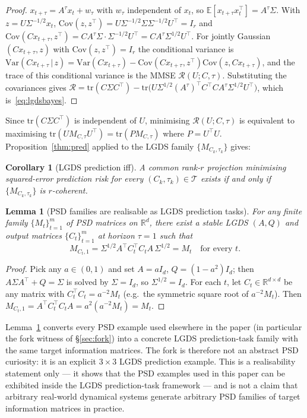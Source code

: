 \documentclass[final,3p,times]{elsarticle}
\newtheorem{corollary}[theorem]{Corollary}
\newtheorem{lemma}[theorem]{Lemma}
\newcommand{\tr}{\mathrm{tr}}
\newcommand{\R}{\mathbb{R}}
\newcommand{\E}{\mathbb{E}}
\begin{document}
\begin{proof}
$x_{t+\tau}=A^\tau x_t+w_\tau$ with $w_\tau$ independent of $x_t$, so
$\E[x_{t+\tau}x_t^\top]=A^\tau\Sigma$.
With $z=U\Sigma^{-1/2}x_t$, $\mathrm{Cov}(z,z^\top)
=U\Sigma^{-1/2}\Sigma\Sigma^{-1/2}U^\top=I_r$ and
$\mathrm{Cov}(Cx_{t+\tau},z^\top)
=CA^\tau\Sigma\cdot\Sigma^{-1/2}U^\top=CA^\tau\Sigma^{1/2}U^\top$.
For jointly Gaussian $(Cx_{t+\tau},z)$ with $\mathrm{Cov}(z,z^\top)=I_r$
the conditional variance is
$\mathrm{Var}(Cx_{t+\tau}\,|\,z)
=\mathrm{Var}(Cx_{t+\tau})-\mathrm{Cov}(Cx_{t+\tau},z^\top)\mathrm{Cov}(z,Cx_{t+\tau})$,
and the trace of this conditional variance is the MMSE
$\mathcal{R}(U;C,\tau)$.
Substituting the covariances gives
$\mathcal{R}=\tr(C\Sigma C^\top)-\tr\!\bigl(U\Sigma^{1/2}(A^\tau)^\top
C^\top C A^\tau\Sigma^{1/2}U^\top\bigr)$, which is~\eqref{eq:lgdsbayes}.
\end{proof}

Since $\tr(C\Sigma C^\top)$ is independent of $U$, minimising
$\mathcal{R}(U;C,\tau)$ is equivalent to maximising
$\tr(U M_{C,\tau} U^\top)=\tr(P M_{C,\tau})$ where $P=U^\top U$.
Proposition~\ref{thm:pred} applied to the LGDS family
$\{M_{C_k,\tau_k}\}$ gives:

\begin{corollary}[LGDS prediction iff]
A common rank-$r$ projection minimising squared-error prediction risk
for every $(C_k,\tau_k)\in\mathcal{T}$ exists if and only if
$\{M_{C_k,\tau_k}\}$ is $r$-coherent.
\end{corollary}

\begin{lemma}[PSD families are realisable as LGDS prediction tasks]
\label{lem:realisability}
For any finite family $\{M_t\}_{t=1}^m$ of PSD matrices on $\R^d$, there
exist a stable LGDS $(A,Q)$ and output matrices $\{C_t\}_{t=1}^m$ at
horizon $\tau=1$ such that
\[
M_{C_t,1}
=\Sigma^{1/2}A^\top C_t^\top C_t A\,\Sigma^{1/2}=M_t
\quad\text{for every }t.
\]
\end{lemma}

\begin{proof}
Pick any $a\in(0,1)$ and set $A=aI_d$, $Q=(1-a^2)I_d$; then
$A\Sigma A^\top+Q=\Sigma$ is solved by $\Sigma=I_d$, so
$\Sigma^{1/2}=I_d$.
For each $t$, let $C_t\in\R^{d\times d}$ be any matrix with
$C_t^\top C_t=a^{-2}M_t$ (e.g.\ the symmetric square root of
$a^{-2}M_t$).
Then $M_{C_t,1}=A^\top C_t^\top C_t A=a^2(a^{-2}M_t)=M_t$.
\end{proof}

\noindent
Lemma~\ref{lem:realisability} converts every PSD example used elsewhere
in the paper (in particular the fork witness of \S\ref{sec:fork}) into
a concrete LGDS prediction-task family with the same target information
matrices.
The fork is therefore not an abstract PSD curiosity: it is an explicit
$3\times 3$ LGDS prediction example.
This is a realisability statement only --- it shows that the
PSD examples used in this paper can be exhibited inside the LGDS
prediction-task framework --- and is not a claim that arbitrary
real-world dynamical systems generate arbitrary PSD families of target
information matrices in practice.
\end{document}

